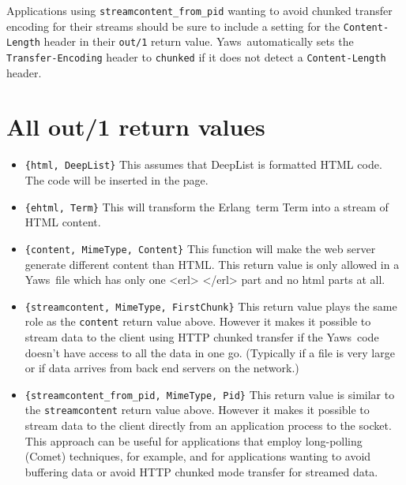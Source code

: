 \documentclass[11pt,oneside,english]{book}
\newcommand{\Erlang}            %
        {{\sc Erlang}}
\newcommand{\Yaws}            %
        {{\sc Yaws}}
\begin{document}
Applications using \verb+streamcontent_from_pid+ wanting to avoid
chunked transfer encoding for their streams should be sure to include
a setting for the \verb+Content-Length+ header in their \verb+out/1+
return value. \Yaws\ automatically sets the \verb+Transfer-Encoding+
header to \verb+chunked+ if it does not detect a \verb+Content-Length+
header.

\section{All out/1 return values}

\begin{itemize}


\item       \verb+{html, DeepList}+
              This  assumes that DeepList is formatted HTML code.
              The code will be inserted in the page.

\item       \verb+{ehtml, Term}+
              This will transform the \Erlang\   term  Term  into  a
              stream of HTML content.

\item       \verb+{content, MimeType, Content}+
              This function will make  the  web  server  generate
              different  content  than HTML. This return value is
              only allowed in a \Yaws\   file  which  has  only  one
              <erl> </erl> part and no html parts at all.

\item       \verb+{streamcontent, MimeType, FirstChunk}+
              This  return  value plays the same role as the
              \verb+content+
              return value above.  However it makes it  possible
              to stream data to the client using HTTP chunked transfer
              if the \Yaws\  code doesn't have access to all  the
              data  in  one  go. (Typically  if  a  file  is  very
              large or if data arrives from back end servers on the
              network.)

\item       \verb+{streamcontent_from_pid, MimeType, Pid}+
              This  return  value  is  similar to the
              \verb+streamcontent+ return value above.  However it
              makes it possible to stream data to the client directly
              from an application process to the socket. This
              approach can be useful for applications that employ
              long-polling (Comet) techniques, for example, and for
              applications wanting to avoid buffering data or avoid
              HTTP chunked mode transfer for streamed data.


\end{itemize}
\end{document}
